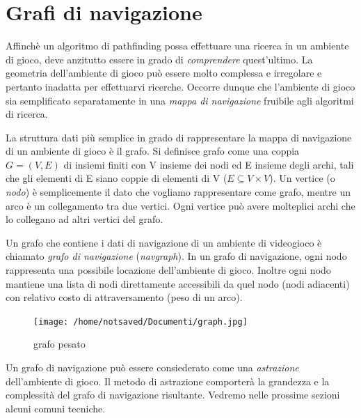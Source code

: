 \documentclass[12pt]{book}
\begin{document}
\section{Grafi di navigazione}
\par{Affinch\`e un algoritmo di pathfinding possa effettuare una ricerca in un ambiente di gioco, deve anzitutto essere in grado di \emph{comprendere} quest'ultimo. La geometria dell'ambiente di gioco pu\`o essere molto complessa e irregolare e pertanto inadatta per effettuarvi ricerche. Occorre dunque che l'ambiente di gioco sia semplificato separatamente in una \emph{mappa di navigazione} fruibile agli algoritmi di ricerca.}
\par{La struttura dati pi\`u semplice in grado di rappresentare la mappa di navigazione di un ambiente di gioco \`e il grafo. Si definisce grafo come una coppia $G = (V, E)$ di insiemi finiti con V insieme dei nodi ed E insieme degli archi, tali che gli elementi di E siano coppie di elementi di V ($E \subseteq V\times V$). Un vertice (o \emph{nodo}) \`e semplicemente il dato che vogliamo rappresentare come grafo, mentre un arco \`e un collegamento tra due vertici. Ogni vertice pu\`o avere molteplici archi che lo collegano ad altri vertici del grafo.}
\par{Un grafo che contiene i dati di navigazione di un ambiente di videogioco \`e chiamato \emph{grafo di navigazione} (\emph{navgraph}). In un grafo di navigazione, ogni nodo rappresenta una possibile locazione dell'ambiente di gioco. Inoltre ogni nodo mantiene una lista di nodi direttamente accessibili da quel nodo (nodi adiacenti) con relativo costo di attraversamento (peso di un arco).}
\begin{figure}[htp]
\centering
\texttt{[image: /home/notsaved/Documenti/graph.jpg]}
\caption{grafo pesato}
\label{graph}
\end{figure}

\par{Un grafo di navigazione pu\`o essere consiederato come una \emph{astrazione} dell'ambiente di gioco. Il metodo di astrazione comporter\`a la grandezza e la complessit\`a del grafo di navigazione risultante. Vedremo nelle prossime sezioni alcuni comuni tecniche.}
\end{document}
